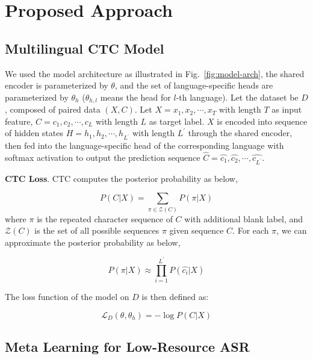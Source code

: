 \section{Proposed Approach}
\label{sec:approach}

\subsection{Multilingual CTC Model}

We used the model architecture as illustrated in Fig.~\ref{fig:model-arch}, the shared encoder is parameterized by $\theta$, and the set of language-specific heads are parameterized by $\theta_h$ ($\theta_{h,l}$ means the head for $l$-th language). Let the dataset be $D$, composed of paired data $(X,C)$. Let $X = x_1, x_2, \cdots, x_T$ with length $T$ as input feature, $C = c_1, c_2, \cdots, c_L$ with length $L$ as target label. $X$ is encoded into sequence of hidden states $H = h_1, h_2, \cdots, h_{L^\prime}$ with length $L^\prime$ through the shared encoder, then fed into the language-specific head of the corresponding language with softmax activation to output the prediction sequence $\hat{C} = \hat{c_1}, \hat{c_2}, \cdots, \hat{c_{L^\prime}}$.

\textbf{CTC Loss}. CTC computes the posterior probability as below,

\begin{equation}
  P(C|X) = \sum_{\pi \in \mathcal{Z}(C)} P(\pi|X)
\end{equation}
where $\pi$ is the repeated character sequence  of $C$ with additional blank label, and $\mathcal{Z}(C)$ is the set of all possible sequences $\pi$ given sequence $C$. For each $\pi$, we can approximate the posterior probability as below,

\begin{equation}
  P(\pi|X) \approx \prod_{i=1}^{L^\prime} P(\hat{c_i}|X)
\end{equation}

The loss function of the model on $D$ is then defined as:

\begin{equation}
  \label{eq:ctc-loss}
  \mathcal{L}_D(\theta, \theta_h) = - \log P(C|X)
\end{equation}

\subsection{Meta Learning for Low-Resource ASR}

